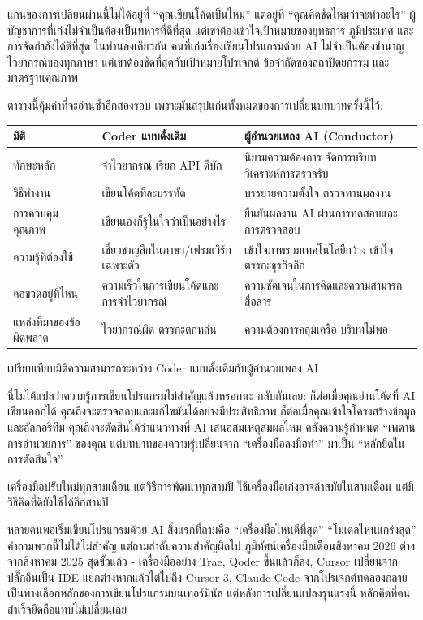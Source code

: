 แกนของการเปลี่ยนผ่านนี้ไม่ได้อยู่ที่ “คุณเขียนโค้ดเป็นไหม” แต่อยู่ที่ “คุณคิดชัดไหมว่าจะทำอะไร” ผู้บัญชาการที่เก่งไม่จำเป็นต้องเป็นทหารที่ดีที่สุด แต่เขาต้องเข้าใจเป้าหมายของยุทธการ ภูมิประเทศ และการจัดกำลังได้ดีที่สุด ในทำนองเดียวกัน คนที่เก่งเรื่องเขียนโปรแกรมด้วย AI ไม่จำเป็นต้องชำนาญไวยากรณ์ของทุกภาษา แต่เขาต้องชัดที่สุดกับเป้าหมายโปรเจกต์ ข้อจำกัดของสถาปัตยกรรม และมาตรฐานคุณภาพ

ตารางนี้คุ้มค่าที่จะอ่านซ้ำอีกสองรอบ เพราะมันสรุปแก่นทั้งหมดของการเปลี่ยนบทบาทครั้งนี้ไว้:

\begin{center}
\begin{tabularx}{\linewidth}{|X|X|X|}
\hline
\textbf{มิติ} & \textbf{Coder แบบดั้งเดิม} & \textbf{ผู้อำนวยเพลง AI (Conductor)} \tabularnewline
\hline
ทักษะหลัก & จำไวยากรณ์ เรียก API ดีบัก & นิยามความต้องการ จัดการบริบท วิเคราะห์การตรวจรับ \tabularnewline
วิธีทำงาน & เขียนโค้ดทีละบรรทัด & บรรยายความตั้งใจ ตรวจทานผลงาน \tabularnewline
การควบคุมคุณภาพ & เขียนเองก็รู้ในใจว่าเป็นอย่างไร & ยืนยันผลงาน AI ผ่านการทดสอบและการตรวจสอบ \tabularnewline
ความรู้ที่ต้องใช้ & เชี่ยวชาญลึกในภาษา/เฟรมเวิร์กเฉพาะตัว & เข้าใจภาพรวมเทคโนโลยีกว้าง เข้าใจตรรกะธุรกิจลึก \tabularnewline
คอขวดอยู่ที่ไหน & ความเร็วในการเขียนโค้ดและการจำไวยากรณ์ & ความชัดเจนในการคิดและความสามารถสื่อสาร \tabularnewline
แหล่งที่มาของข้อผิดพลาด & ไวยากรณ์ผิด ตรรกะตกหล่น & ความต้องการคลุมเครือ บริบทไม่พอ \tabularnewline
\hline
\end{tabularx}
\end{center}

\begin{center}\small\color{gray}เปรียบเทียบมิติความสามารถระหว่าง Coder แบบดั้งเดิมกับผู้อำนวยเพลง AI\end{center}

นี่ไม่ได้แปลว่าความรู้การเขียนโปรแกรมไม่สำคัญแล้วหรอกนะ กลับกันเลย: ก็ต่อเมื่อคุณอ่านโค้ดที่ AI เขียนออกได้ คุณถึงจะตรวจสอบและแก้ไขมันได้อย่างมีประสิทธิภาพ ก็ต่อเมื่อคุณเข้าใจโครงสร้างข้อมูลและอัลกอริทึม คุณถึงจะตัดสินได้ว่าแนวทางที่ AI เสนอสมเหตุสมผลไหม คลังความรู้กำหนด “เพดานการอำนวยการ” ของคุณ แต่บทบาทของความรู้เปลี่ยนจาก “เครื่องมือลงมือทำ” มาเป็น “หลักยึดในการตัดสินใจ”


เครื่องมือปรับใหม่ทุกสามเดือน แต่วิธีการพัฒนาทุกสามปี ใช้เครื่องมือเก่งอาจล้าสมัยในสามเดือน แต่มีวิธีคิดที่ดียังใช้ได้อีกสามปี

หลายคนพอเริ่มเขียนโปรแกรมด้วย AI สิ่งแรกที่ถามคือ “เครื่องมือไหนดีที่สุด” “โมเดลไหนแกร่งสุด” คำถามพวกนี้ไม่ได้ไม่สำคัญ แต่ถามลำดับความสำคัญผิดไป ภูมิทัศน์เครื่องมือเดือนสิงหาคม 2026 ต่างจากสิงหาคม 2025 สุดขั้วแล้ว - เครื่องมืออย่าง Trae, Qoder ขึ้นแล้วก็ลง, Cursor เปลี่ยนจากปลั๊กอินเป็น IDE แยกต่างหากแล้วไต่ไปถึง Cursor 3, Claude Code จากโปรเจกต์ทดลองกลายเป็นทางเลือกหลักของการเขียนโปรแกรมบนเทอร์มินัล แต่หลังการเปลี่ยนแปลงรุนแรงนี้ หลักคิดที่คนสำเร็จยึดถือแทบไม่เปลี่ยนเลย

